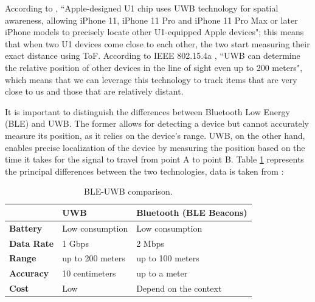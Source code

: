 \documentclass[english]{article}
\begin{document}
According to \cite{aps}, ``Apple-designed U1 chip uses UWB technology for spatial awareness, allowing iPhone 11, iPhone 11 Pro and iPhone 11 Pro Max or later iPhone models to precisely locate other U1-equipped Apple devices"; this means that when two U1 devices come close to each other, the two start measuring their exact distance using ToF. According to IEEE 802.15.4a \cite{5394030}, ``UWB can determine the relative position of other devices in the line of sight even up to 200 meters", which means that we can leverage this technology to track items that are very close to us and those that are relatively distant.

It is important to distinguish the differences between Bluetooth Low Energy (BLE) and UWB. The former allows for detecting a device but cannot accurately measure its position, as it relies on the device's range. UWB, on the other hand, enables precise localization of the device by measuring the position based on the time it takes for the signal to travel from point A to point B.
Table \ref{tableu} represents the principal differences between the two technologies, data is taken from \cite{encstore}:
\begin{table}[h] 
\caption{BLE-UWB comparison.}
  \centering
  
    \begin{tabular}{l|l|l|}
      \cline{2-3}
      {}                               & {\textbf{UWB}}                & { \textbf{Bluetooth (BLE Beacons)}} \\ \hline
      \multicolumn{1}{|l|}{{  \textbf{Battery}}}  & {  Low consumption}             & {  Low consumption}                  \\ \hline
      \multicolumn{1}{|l|}{{  \textbf{Data Rate}}}  & { 1 Gbps }             & { 2 Mbps }                  \\ \hline
      \multicolumn{1}{|l|}{{  \textbf{Range}}}    & {  up to 200 meters} & {  up to 100 meters}       \\ \hline
      \multicolumn{1}{|l|}{{  \textbf{Accuracy}}} & {  10 centimeters} & {  up to a meter}                    \\ \hline
      \multicolumn{1}{|l|}{{  \textbf{Cost}}}     & {  Low}                         & {Depend on the context }                              \\ \hline
    \end{tabular}
    \label{tableu}
  \end{table}
\end{document}

